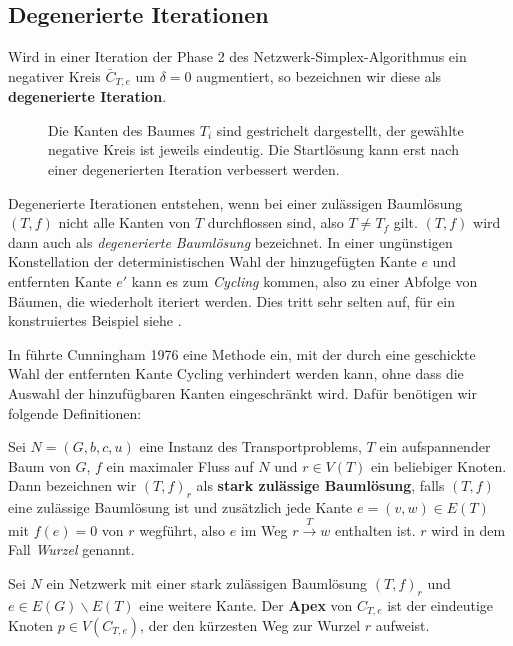 \subsection{Degenerierte Iterationen}\label{ch:deg}

\begin{defn}Wird in einer Iteration der Phase 2 des Netzwerk-Simplex-Algorithmus ein negativer Kreis $\bar{C}_{T,e}$ um $\delta=0$ augmentiert, so bezeichnen wir diese als \textbf{degenerierte Iteration}.
\end{defn}

\begin{figure}[!ht]\centering
	
	\caption{Die Kanten des Baumes $T_i$ sind gestrichelt dargestellt, der gewählte negative Kreis ist jeweils eindeutig. Die Startlösung kann erst nach einer degenerierten Iteration verbessert werden.}
	\label{fig:deg}
\end{figure}

Degenerierte Iterationen entstehen, wenn bei einer zulässigen Baumlösung $(T,f)$ nicht alle Kanten von $T$ durchflossen sind, also $T\neq T_f$ gilt. $(T,f)$ wird dann auch als \emph{degenerierte Baumlösung} bezeichnet. In einer ungünstigen Konstellation der deterministischen Wahl der hinzugefügten Kante $e$ und entfernten Kante $e'$ kann es zum \emph{Cycling} kommen, also zu einer Abfolge von Bäumen, die wiederholt iteriert werden. Dies tritt sehr selten auf, für ein konstruiertes Beispiel siehe \cite[S. 303]{NSAbook}.

In \cite{cycling} führte Cunningham 1976 eine Methode ein, mit der durch eine geschickte Wahl der entfernten Kante Cycling verhindert werden kann, ohne dass die Auswahl der hinzufügbaren Kanten eingeschränkt wird. Dafür benötigen wir folgende Definitionen:

\begin{defn}Sei $N=(G,b,c,u)$ eine Instanz des Transportproblems, $T$ ein aufspannender Baum von $G$, $f$ ein maximaler Fluss auf $N$ und $r\in V(T)$ ein beliebiger Knoten. Dann bezeichnen wir $(T,f)_r$ als \textbf{stark zulässige Baumlösung}, falls $(T,f)$ eine zulässige Baumlösung ist und zusätzlich jede Kante $e=(v,w)\in E(T)$ mit $f(e)=0$ von $r$ wegführt, also $e$ im Weg $r\xrightarrow{T}w$ enthalten ist. $r$ wird in dem Fall \emph{Wurzel} genannt.\end{defn}

\begin{defn}Sei $N$ ein Netzwerk mit einer stark zulässigen Baumlösung $(T,f)_r$ und $e\in E(G)\backslash E(T)$ eine weitere Kante. Der \textbf{Apex} von $C_{T,e}$ ist der eindeutige Knoten $p\in V(C_{T,e})$, der den kürzesten Weg zur Wurzel $r$ aufweist.\end{defn}

